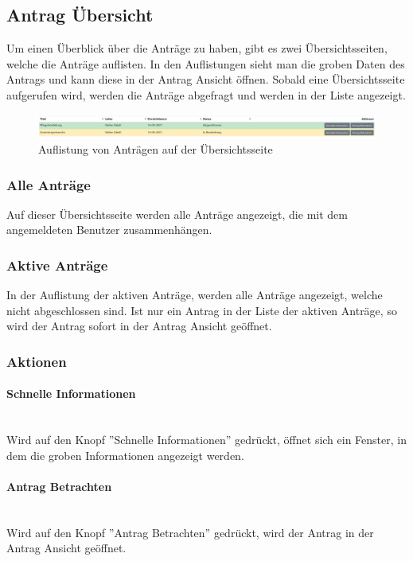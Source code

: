 \subsection{Antrag Übersicht}
\label{sec:antrag_uebersicht}
Um einen Überblick über die Anträge zu haben, gibt es zwei Übersichtsseiten, welche die Anträge auflisten. In den Auflistungen sieht man die groben Daten des Antrags und kann diese in der Antrag Ansicht öffnen. Sobald eine Übersichtsseite aufgerufen wird, werden die Anträge abgefragt und werden in der Liste angezeigt.
\begin{figure}[H]
	\centering
	\includegraphics[width=1\linewidth]{images/liste_antrag}
	\caption[Liste der Anträge]{Auflistung von Anträgen auf der Übersichtsseite}
	\label{fig:listeantrag}
\end{figure}

\subsubsection{Alle Anträge}
Auf dieser Übersichtsseite werden alle Anträge angezeigt, die mit dem angemeldeten Benutzer zusammenhängen.
\subsubsection{Aktive Anträge}
In der Auflistung der aktiven Anträge, werden alle Anträge angezeigt, welche nicht abgeschlossen sind. Ist nur ein Antrag in der Liste der aktiven Anträge, so wird der Antrag sofort in der Antrag Ansicht geöffnet.
\subsubsection{Aktionen}
\paragraph{Schnelle Informationen}~\\
Wird auf den Knopf ''Schnelle Informationen'' gedrückt, öffnet sich ein Fenster, in dem die groben Informationen angezeigt werden.
\paragraph{Antrag Betrachten}~\\
Wird auf den Knopf ''Antrag Betrachten'' gedrückt, wird der Antrag in der Antrag Ansicht geöffnet.
\newpage
